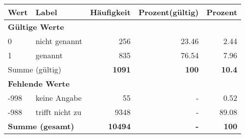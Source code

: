      \begin{longtable}{lXrrr}
     \toprule
     \textbf{Wert} & \textbf{Label} & \textbf{Häufigkeit} & \textbf{Prozent(gültig)} & \textbf{Prozent} \\
     \endhead
     \midrule
     \multicolumn{5}{l}{\textbf{Gültige Werte}}\\

     0 &
     \multicolumn{1}{X}{ nicht genannt   } &


       \num{256} &
       \num[round-mode=places,round-precision=2]{23,46} &
         \num[round-mode=places,round-precision=2]{2,44} \\

     1 &
     \multicolumn{1}{X}{ genannt   } &


       \num{835} &
       \num[round-mode=places,round-precision=2]{76,54} &
         \num[round-mode=places,round-precision=2]{7,96} \\
     \midrule
     \multicolumn{2}{l}{Summe (gültig)} &
       \textbf{\num{1091}} &
     \textbf{100} &
       \textbf{\num[round-mode=places,round-precision=2]{10,4}} \\
     \multicolumn{5}{l}{\textbf{Fehlende Werte}}\\
       -998 &
       keine Angabe &
         \num{55} &
        - &
         \num[round-mode=places,round-precision=2]{0,52} \\
       -988 &
       trifft nicht zu &
         \num{9348} &
        - &
         \num[round-mode=places,round-precision=2]{89,08} \\
     \midrule
     \multicolumn{2}{l}{\textbf{Summe (gesamt)}} &
          \textbf{\num{10494}} &
        \textbf{-} &
        \textbf{100} \\
     \bottomrule
     \end{longtable}
     

